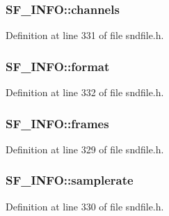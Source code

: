 \subsubsection[{\texorpdfstring{channels}{channels}}]{ S\+F\+\_\+\+I\+N\+F\+O\+::channels}\hypertarget{struct_s_f___i_n_f_o_aad5220b31d2672bf83d3cf4cea0b2826}{}\label{struct_s_f___i_n_f_o_aad5220b31d2672bf83d3cf4cea0b2826}


Definition at line 331 of file sndfile.\+h.

\subsubsection[{\texorpdfstring{format}{format}}]{ S\+F\+\_\+\+I\+N\+F\+O\+::format}\hypertarget{struct_s_f___i_n_f_o_a36a7c3ae9a8229797f19267b4ba07361}{}\label{struct_s_f___i_n_f_o_a36a7c3ae9a8229797f19267b4ba07361}


Definition at line 332 of file sndfile.\+h.

\subsubsection[{\texorpdfstring{frames}{frames}}]{ S\+F\+\_\+\+I\+N\+F\+O\+::frames}\hypertarget{struct_s_f___i_n_f_o_a80838e7063ecc3d8d7ff9f92ab1efdfb}{}\label{struct_s_f___i_n_f_o_a80838e7063ecc3d8d7ff9f92ab1efdfb}


Definition at line 329 of file sndfile.\+h.

\subsubsection[{\texorpdfstring{samplerate}{samplerate}}]{ S\+F\+\_\+\+I\+N\+F\+O\+::samplerate}\hypertarget{struct_s_f___i_n_f_o_acfd248e20ab1c58b57aafc7b16404a5f}{}\label{struct_s_f___i_n_f_o_acfd248e20ab1c58b57aafc7b16404a5f}


Definition at line 330 of file sndfile.\+h.

